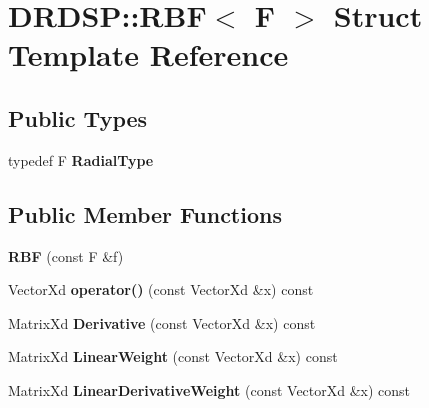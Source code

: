 \hypertarget{struct_d_r_d_s_p_1_1_r_b_f}{\section{D\-R\-D\-S\-P\-:\-:R\-B\-F$<$ F $>$ Struct Template Reference}
\label{struct_d_r_d_s_p_1_1_r_b_f}
}
\subsection*{Public Types}
\begin{DoxyCompactItemize}
\item 
\hypertarget{struct_d_r_d_s_p_1_1_r_b_f_a00ab98fe7441b683d5b9230650d0210f}{typedef F {\bfseries Radial\-Type}}\label{struct_d_r_d_s_p_1_1_r_b_f_a00ab98fe7441b683d5b9230650d0210f}

\end{DoxyCompactItemize}
\subsection*{Public Member Functions}
\begin{DoxyCompactItemize}
\item 
\hypertarget{struct_d_r_d_s_p_1_1_r_b_f_a292acb1f027729dccad15e3e5a1fe5b8}{{\bfseries R\-B\-F} (const F \&f)}\label{struct_d_r_d_s_p_1_1_r_b_f_a292acb1f027729dccad15e3e5a1fe5b8}

\item 
\hypertarget{struct_d_r_d_s_p_1_1_r_b_f_a3ca26fb2fdb36f5361b15a7b1e8f4ef3}{Vector\-Xd {\bfseries operator()} (const Vector\-Xd \&x) const }\label{struct_d_r_d_s_p_1_1_r_b_f_a3ca26fb2fdb36f5361b15a7b1e8f4ef3}

\item 
\hypertarget{struct_d_r_d_s_p_1_1_r_b_f_a68fd3bbc2d3ce97a06205b16e9041aad}{Matrix\-Xd {\bfseries Derivative} (const Vector\-Xd \&x) const }\label{struct_d_r_d_s_p_1_1_r_b_f_a68fd3bbc2d3ce97a06205b16e9041aad}

\item 
\hypertarget{struct_d_r_d_s_p_1_1_r_b_f_a1f943d60c73f695e2891a071bc805b09}{Matrix\-Xd {\bfseries Linear\-Weight} (const Vector\-Xd \&x) const }\label{struct_d_r_d_s_p_1_1_r_b_f_a1f943d60c73f695e2891a071bc805b09}

\item 
\hypertarget{struct_d_r_d_s_p_1_1_r_b_f_ac48c6056d1804dec0a951b4806ae3bca}{Matrix\-Xd {\bfseries Linear\-Derivative\-Weight} (const Vector\-Xd \&x) const }\label{struct_d_r_d_s_p_1_1_r_b_f_ac48c6056d1804dec0a951b4806ae3bca}

\end{DoxyCompactItemize}
